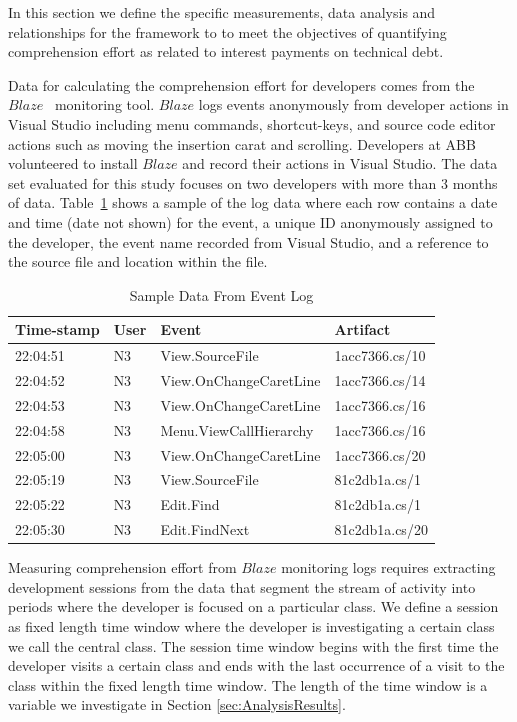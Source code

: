 In this section we define the specific measurements, data analysis and relationships for the framework to to meet the objectives of quantifying comprehension effort as related to interest payments on technical debt.

Data for calculating the comprehension effort for developers comes from the $Blaze$~\cite{Snipes_etal:2014} monitoring tool.  $Blaze$ logs events anonymously from developer actions in Visual Studio including menu commands, shortcut-keys, and source code editor actions such as moving the insertion carat and scrolling.  Developers at ABB volunteered to install $Blaze$ and record their actions in Visual Studio.  The data set evaluated for this study focuses on two developers with more than 3 months of data.  Table~\ref{fig:SampleEventData} shows a sample of the log data where each row contains a date and time (date not shown) for the event, a unique ID anonymously assigned to the developer, the event name recorded from Visual Studio, and a reference to the source file and location within the file.

\begin{table}[!t]
\renewcommand{\arraystretch}{1.3}
\centering
	\caption{Sample Data From Event Log}
	\begin{tabular}{llll}
	\toprule
\textbf{Time-stamp} & \textbf{User} & \textbf{Event} & \textbf{Artifact} \\
\midrule
22:04:51 & N3 & View.SourceFile & 1acc7366.cs/10 \\
22:04:52 & N3 & View.OnChangeCaretLine & 1acc7366.cs/14 \\
22:04:53 & N3 & View.OnChangeCaretLine & 1acc7366.cs/16 \\
22:04:58 & N3 & Menu.ViewCallHierarchy & 1acc7366.cs/16 \\
22:05:00 & N3 & View.OnChangeCaretLine & 1acc7366.cs/20 \\
22:05:19 & N3 & View.SourceFile & 81c2db1a.cs/1 \\
22:05:22 & N3 & Edit.Find & 81c2db1a.cs/1 \\
22:05:30 & N3 & Edit.FindNext & 81c2db1a.cs/20 \\
\bottomrule
	\end{tabular}
	\label{fig:SampleEventData}
\end{table}

Measuring comprehension effort from $Blaze$ monitoring logs requires extracting development sessions from the data that segment the stream of activity into periods where the developer is focused on a particular class.  We define a session as fixed length time window where the developer is investigating a certain class we call the central class.  The session time window begins with the first time the developer visits a certain class and ends with the last occurrence of a visit to the class within the fixed length time window.  The length of the time window is a variable we investigate in Section \ref{sec:AnalysisResults}.  

